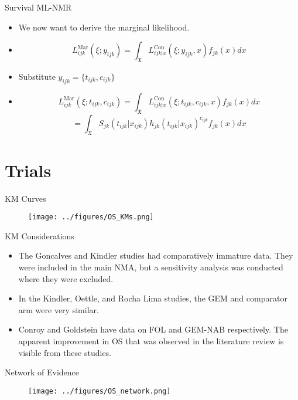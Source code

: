 \documentclass{beamer}
\begin{document}
\begin{frame}{Survival ML-NMR}
    \begin{itemize}
        \item We now want to derive the marginal likelihood.
        \pause
        \item \[L_{ijk}^{\text{Mar}}(\xi; y_{ijk}) = \int_{\mathfrak{X}} L_{ijk|x}^{\text{Con}}(\xi; y_{ijk}, x)f_{jk}(x)dx\]
        \pause
        \item Substitute $y_{ijk} = \{t_{ijk}, c_{ijk}\}$
        \pause 
        \item \[L_{ijk}^{\text{Mar}}(\xi; t_{ijk}, c_{ijk}) = \int_{\mathfrak{X}} L_{ijk|x}^{\text{Con}}(\xi; t_{ijk}, c_{ijk}, x)f_{jk}(x)dx\]
                                          \[ = \int_{\mathfrak{X}} S_{jk}(t_{ijk}| x_{ijk})h_{jk}(t_{ijk}|x_{ijk})^{c_{ijk}} f_{jk}(x)dx\]
    \end{itemize}
\end{frame}

\section{Trials}

\begin{frame}{KM Curves}
    \begin{figure}
        \texttt{[image: ../figures/OS\_KMs.png]}
    \end{figure}    
\end{frame}

\begin{frame}{KM Considerations}
    \begin{itemize}
        \item The Goncalves and Kindler studies had comparatively immature data. They were included in the main NMA, but a sensitivity analysis was conducted where they were excluded. 
        \pause
        \item In the Kindler, Oettle, and Rocha Lima studies, the GEM and comparator arm were very similar. 
        \pause
        \item Conroy and Goldstein have data on FOL and GEM-NAB respectively. The apparent improvement in OS that was observed in the literature review is visible from these studies. 
    \end{itemize}
\end{frame}

\begin{frame}{Network of Evidence}
    \begin{figure}
        \texttt{[image: ../figures/OS\_network.png]}
    \end{figure}    
\end{frame}
\end{document}
